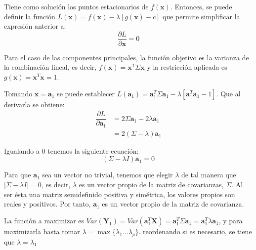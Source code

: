 \noindent Tiene como solución los puntos estacionarios de $f(\textbf{x})$. Entonces, se puede definir la función $L(\textbf{x})= f(\textbf{x})-\lambda[g(\textbf{x})-c]$  que permite simplificar la expresión anterior a:
\begin{equation}
\dfrac{\partial L}{\partial \textbf{x}}=0
\end{equation}

\noindent Para el caso de las componentes principales, la función objetivo es la varianza de la combinación lineal, es decir, $f(\textbf{x})=\textbf{x}^T \Sigma \textbf{x}$ y la restricción aplicada es $g(\textbf{x})=\textbf{x}^T\textbf{x}=1$. 

\noindent Tomando $\textbf{x}=\textbf{a}_1$ se puede establecer $L(\textbf{a}_1)=\textbf{a}_1^T \Sigma \textbf{a}_1 - \lambda[\textbf{a}_1^T \textbf{a}_1-1]$. Que al derivarla se obtiene:
\begin{align*}
\dfrac{\partial L}{\partial \textbf{a}_1} &= 2\Sigma \textbf{a}_1 - 2\lambda\textbf{a}_1\\
& = 2(\Sigma-\lambda)\textbf{a}_1 
\end{align*}

\noindent Igualando a 0 tenemos la siguiente ecuación: 
\begin{equation}
(\Sigma-\lambda I)\textbf{a}_1=0
\end{equation}

\noindent Para que $\textbf{a}_1$ sea un vector no trivial, tenemos que elegir $\lambda$ de tal manera que $|\Sigma-\lambda I| = 0$, es decir, $\lambda$ es un vector propio de la matriz de covarianzas, $\Sigma$. Al ser ésta una matriz semidefinido positiva y simétrica, los valores propios son reales y positivos. Por tanto, $\textbf{a}_1$ es un vector propio de la matriz de covarianza.

\noindent La función a maximizar es $Var(\textbf{Y}_1)=Var(\textbf{a}_1^T\textbf{X})=\textbf{a}_1^T\Sigma \textbf{a}_1=\textbf{a}_1^T\lambda \textbf{a}_1$, y para maximizarla basta tomar $\lambda=\max{\lbrace\lambda_1\ldots \lambda_p\rbrace}$. reordenando si es necesario, se tiene que $\lambda=\lambda_1$ 




